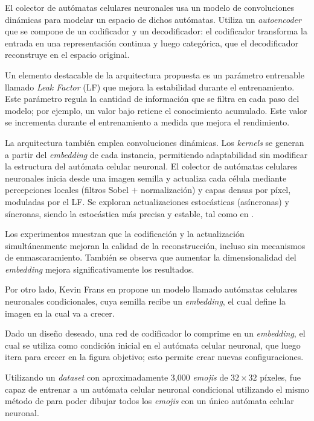 El colector de autómatas celulares neuronales usa un modelo de convoluciones dinámicas para modelar un espacio de dichos autómatas. Utiliza un \textit{autoencoder} que se compone de un codificador y un decodificador: el codificador transforma la entrada en una representación continua y luego categórica, que el decodificador reconstruye en el espacio original.

Un elemento destacable de la arquitectura propuesta es un parámetro entrenable llamado \textit{Leak Factor} (LF) que mejora la estabilidad durante el entrenamiento. Este parámetro regula la cantidad de información que se filtra en cada paso del modelo; por ejemplo, un valor bajo retiene el conocimiento acumulado. Este valor se incrementa durante el entrenamiento a medida que mejora el rendimiento.

La arquitectura también emplea convoluciones dinámicas. Los \textit{kernels} se generan a partir del \textit{embedding} de cada instancia, permitiendo adaptabilidad sin modificar la estructura del autómata celular neuronal. El colector de autómatas celulares neuronales inicia desde una imagen semilla y actualiza cada célula mediante percepciones locales (filtros Sobel $+$ normalización) y capas densas por píxel, moduladas por el LF. Se exploran actualizaciones estocásticas (asíncronas) y síncronas, siendo la estocástica más precisa y estable, tal como en \cite{niklasson2021_nca}.

Los experimentos muestran que la codificación y la actualización simultáneamente mejoran la calidad de la reconstrucción, incluso sin mecanismos de enmascaramiento. También se observa que aumentar la dimensionalidad del \textit{embedding} mejora significativamente los resultados.

Por otro lado, Kevin Frans en \cite{frans2021_stampca} propone un modelo llamado autómatas celulares neuronales condicionales, cuya semilla recibe un \textit{embedding}, el cual define la imagen en la cual va a crecer. 

Dado un diseño deseado, una red de codificador lo comprime en un \textit{embedding}, el cual se utiliza como condición inicial en el autómata celular neuronal, que luego itera para crecer en la figura objetivo; esto permite crear nuevas configuraciones.

Utilizando un \textit{dataset} con aproximadamente 3,000 \textit{emojis} de $32 \times 32$ píxeles, fue capaz de entrenar a un autómata celular neuronal condicional utilizando el mismo método de \cite{mordvintsev2020_nca} para poder dibujar todos los \textit{emojis} con un único autómata celular neuronal.

